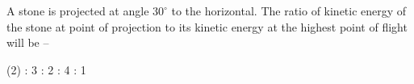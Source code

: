 \item A stone is projected at angle $30^\circ$ to the horizontal. The ratio of kinetic energy of the stone at point of projection to its kinetic energy at the highest point of flight will be –
\begin{tasks}(2)
     : 3
     : 2
     : 4
     : 1 
\end{tasks}
